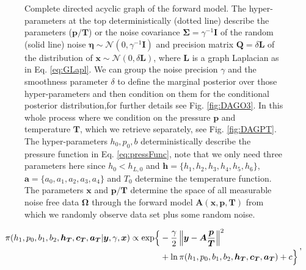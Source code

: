 \begin{figure}[thb!]
\caption[Complete directed acyclic graph of the forward model.]{Complete directed acyclic graph of the forward model. The hyper-parameters at the top deterministically (dotted line) describe the parameters ($\bm{p}/\bm{T}$) or the noise covariance $\bm{\Sigma} = \gamma^{-1} \bm{I}$ of the random (solid line) noise $\bm{\eta} \sim \mathcal{N}(0,\gamma^{-1} \bm{I} ) $ and precision matrix $\bm{Q} = \delta \bm{L}$ of the distribution of $\bm{x}\sim \mathcal{N}(0,\delta \bm{L}) $, where $\bm{L}$ is a graph Laplacian as in Eq. \ref{eq:GLapl}. We can group the noise precision $\gamma$  and the smoothness parameter $\delta$ to define the marginal posterior over those hyper-parameters and then condition on them for the conditional posterior distribution,for further details see Fig. \ref{fig:DAGO3}. In this whole process where we condition on the pressure $\bm{p}$ and temperature $\bm{T}$, which we retrieve separately, see Fig. \ref{fig:DAGPT}. The hyper-parameters $h_0,p_0,b$ deterministically describe the pressure function in Eq. \ref{eq:pressFunc}, note that we only need three parameters here since $h_0< h_{L,0}$ and $\bm{h}= \{ h_1, h_2,h_3,h_4,h_5,h_6\}$, $\bm{a} = \{ a_0, a_1, a_2,a_3,a_4\}$ and $T_0$ determine the temperature function.
The parameters $\bm{x}$ and $\bm{p}/ \bm{T}$ determine the space of all measurable noise free data $\bm{\Omega}$ through the forward model $\bm{A}(\bm{x},\bm{p},\bm{T})$ from which we randomly observe data set plus some random noise.}
\label{fig:DAGComplete}
\end{figure}


\begin{align}
	\begin{split}
		\pi(h_1,p_0,b_1,b_2,\bm{h_T},\bm{c_T},\bm{a_T} | \bm{y}, \gamma, \bm{x}) \propto  \exp\Bigl\{ & -\frac{\gamma}{2} \left\Vert \bm{y}- \bm{A} \frac{\bm{p}}{\bm{T}}  \right\Vert^2 \\ &+ \ln{\pi(h_1,p_0,b_1,b_2,\bm{h_T},\bm{c_T},\bm{a_T}) + c \Bigr\}  }
	\end{split} \, ,
\end{align}


